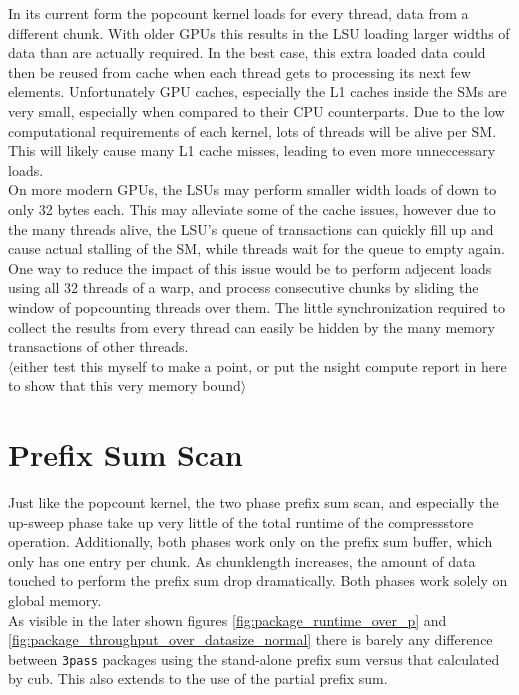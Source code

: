 \documentclass{tudscrreprt}
\newcommand{\markr}[1]{\textcolor{review}{$\langle$#1$\rangle$}}
\begin{document}
			In its current form the popcount kernel loads for every thread, data from a different chunk. With older GPUs this results in the LSU loading larger widths of data than are actually required. In the best case, this extra loaded data could then be reused from cache when each thread gets to processing its next few elements. Unfortunately GPU caches, especially the L1 caches inside the SMs are very small, especially when compared to their CPU counterparts. Due to the low computational requirements of each kernel, lots of threads will be alive per SM. This will likely cause many L1 cache misses, leading to even more unneccessary loads. \\
			On more modern GPUs, the LSUs may perform smaller width loads of down to only 32 bytes each. This may alleviate some of the cache issues, however due to the many threads alive, the LSU's queue of transactions can quickly fill up and cause actual stalling of the SM, while threads wait for the queue to empty again. \\
			One way to reduce the impact of this issue would be to perform adjecent loads using all 32 threads of a warp, and process consecutive chunks by sliding the window of popcounting threads over them. The little synchronization required to collect the results from every thread can easily be hidden by the many memory transactions of other threads. \\
			\markr{either test this myself to make a point, or put the nsight compute report in here to show that this very memory bound} \\
			
		
		\section{Prefix Sum Scan}
			Just like the popcount kernel, the two phase prefix sum scan, and especially the up-sweep phase take up very little of the total runtime of the compressstore operation. Additionally, both phases work only on the prefix sum buffer, which only has one entry per chunk. As chunklength increases, the amount of data touched to perform the prefix sum drop dramatically. Both phases work solely on global memory. \\
		
			As visible in the later shown figures \ref{fig:package_runtime_over_p} and \ref{fig:package_throughput_over_datasize_normal} there is barely any difference between \texttt{3pass} packages using the stand-alone prefix sum versus that calculated by cub. This also extends to the use of the partial prefix sum. \\
		
\end{document}
